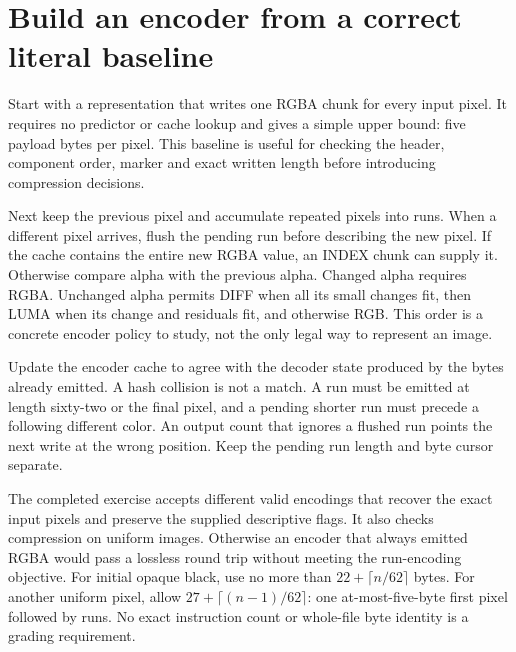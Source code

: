 \section{Build an encoder from a correct literal baseline}
Start with a representation that writes one RGBA chunk for every input pixel. It
requires no predictor or cache lookup and gives a simple upper bound: five payload
bytes per pixel. This baseline is useful for checking the header, component order,
marker and exact written length before introducing compression decisions.

Next keep the previous pixel and accumulate repeated pixels into runs. When a different
pixel arrives, flush the pending run before describing the new pixel. If the cache
contains the entire new RGBA value, an INDEX chunk can supply it. Otherwise compare
alpha with the previous alpha. Changed alpha requires RGBA. Unchanged alpha permits
DIFF when all its small changes fit, then LUMA when its change and residuals fit, and
otherwise RGB. This order is a concrete encoder policy to study, not the only legal
way to represent an image.

Update the encoder cache to agree with the decoder state produced by the bytes already
emitted. A hash collision is not a match. A run must be emitted at length sixty-two
or the final pixel, and a pending shorter run must precede a following different color.
An output count that ignores a flushed run points the next write at the wrong position.
Keep the pending run length and byte cursor separate.

The completed exercise accepts different valid encodings that recover the exact input
pixels and preserve the supplied descriptive flags. It also checks compression on
uniform images. Otherwise an encoder that always emitted RGBA would pass a lossless
round trip without meeting the run-encoding objective. For initial opaque black, use
no more than \(22+\lceil n/62\rceil\) bytes. For another uniform pixel, allow
\(27+\lceil(n-1)/62\rceil\): one at-most-five-byte first pixel followed by runs.
No exact instruction count or whole-file byte identity is a grading requirement.
